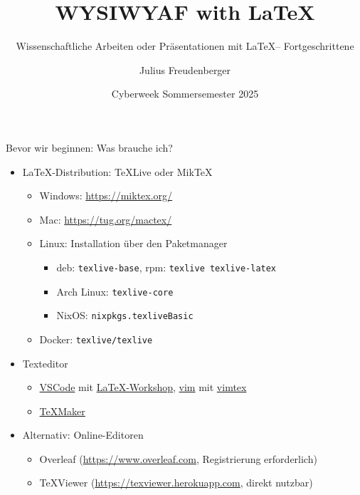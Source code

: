 \documentclass[presentation,aspectratio=169]{beamer}
\author{Julius Freudenberger}
\date{Cyberweek Sommersemester 2025}
\title{WYSIWYAF with \LaTeX}
\subtitle{Wissenschaftliche Arbeiten oder Präsentationen mit \LaTeX -- Fortgeschrittene}
\institute[Hochschule Esslingen]{Hochschule Esslingen}
\begin{document}
\maketitle

\begin{frame}[fragile]{Bevor wir beginnen: Was brauche ich?}
  \begin{itemize}
    \item \LaTeX-Distribution: \TeX{}Live oder Mik\TeX{}
      \begin{itemize}
        \item Windows: \href{https://miktex.org/}{https://miktex.org/}
        \item Mac: \href{https://tug.org/mactex/}{https://tug.org/mactex/}
        \item Linux: Installation über den Paketmanager
          \begin{itemize}
            \item deb: \verb|texlive-base|, rpm: \verb|texlive texlive-latex|
            \item Arch Linux: \verb|texlive-core|
            \item NixOS: \verb|nixpkgs.texliveBasic|
          \end{itemize}
        \item Docker: \verb|texlive/texlive|
      \end{itemize}
    \item Texteditor
      \begin{itemize}
        \item \href{https://code.visualstudio.com/}{VSCode} mit \href{https://marketplace.visualstudio.com/items?itemName=James-Yu.latex-workshop}{\LaTeX-Workshop}, \href{https://www.vim.org/}{vim} mit \href{https://github.com/lervag/vimtex}{vimtex}
        \item \href{https://www.xm1math.net/texmaker/index.html}{\TeX{}Maker}
      \end{itemize}
    \item Alternativ: Online-Editoren
      \begin{itemize}
        \item Overleaf (\href{https://www.overleaf.com}{https://www.overleaf.com}, Registrierung erforderlich)
        \item \TeX{}Viewer (\href{https://texviewer.herokuapp.com}{https://texviewer.herokuapp.com}, direkt nutzbar)
      \end{itemize}
  \end{itemize}
\end{frame}
\end{document}
